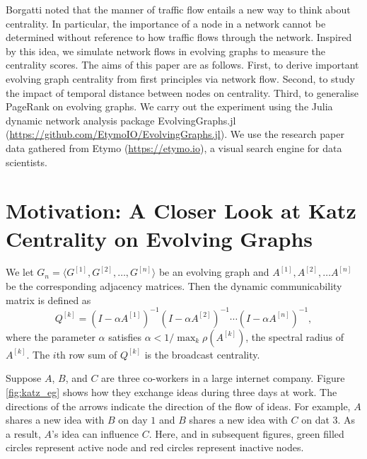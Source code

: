 \documentclass[12pt]{article}
\theoremstyle{definition}
\begin{document}
Borgatti \cite{borgatti05} noted that the manner of traffic flow entails a new way to think about centrality. In particular, the importance of a node in a network cannot be determined without reference to how traffic flows through the network.
Inspired by this idea, we simulate network flows in evolving graphs to measure the centrality scores.
The aims of this paper are as follows. First, to derive important evolving graph centrality from first principles via network flow. Second, to study the impact of temporal distance between nodes on centrality.
Third, to generalise PageRank on evolving graphs.
We carry out the experiment using the Julia dynamic network analysis package
EvolvingGraphs.jl (\url{https://github.com/EtymoIO/EvolvingGraphs.jl}).
We use the research paper data gathered from Etymo (\url{https://etymo.io}), a visual search engine for data scientists.


\section{Motivation: A Closer Look at Katz Centrality on Evolving Graphs}
\label{sec:motivation}

We let $G_n = \langle G^{[1]}, G^{[2]}, \ldots, G^{[n]} \rangle$ be an evolving graph
and $A^{[1]}, A^{[2]}, \dots A^{[n]}$ be the corresponding adjacency matrices.
Then the dynamic communicability matrix is defined as
\begin{equation}
  \label{eq:q}
  Q^{[k]} = (I - \alpha A^{[1]})^{-1}(I - \alpha A^{[2]})^{-1} \cdots (I -  \alpha A^{[n]})^{-1},
\end{equation}
where the parameter $\alpha$ satisfies $\alpha < 1/ \max_k \rho(A^{[k]})$, the spectral radius of $A^{[k]}$.
The $i$th row sum of $Q^{[k]}$ is the broadcast centrality.


Suppose $A$, $B$, and $C$ are three co-workers in a large internet company. Figure \ref{fig:katz_eg}
shows how they exchange ideas during three days at work. The directions of the arrows indicate the direction of the flow of ideas.
For example, $A$ shares a new idea with $B$ on day $1$ and $B$ shares a new idea with $C$ on dat $3$. As a result, $A$'s idea can influence $C$. Here, and in subsequent figures, green filled circles represent active node and red circles represent inactive nodes.
\end{document}
